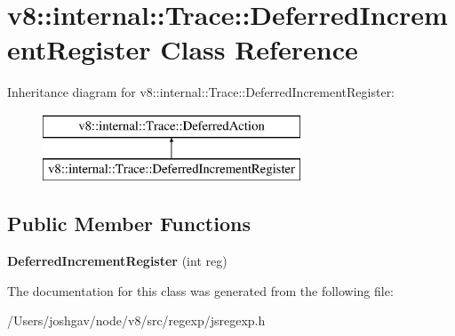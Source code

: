 \hypertarget{classv8_1_1internal_1_1_trace_1_1_deferred_increment_register}{}\section{v8\+:\+:internal\+:\+:Trace\+:\+:Deferred\+Increment\+Register Class Reference}
\label{classv8_1_1internal_1_1_trace_1_1_deferred_increment_register}
Inheritance diagram for v8\+:\+:internal\+:\+:Trace\+:\+:Deferred\+Increment\+Register\+:\begin{figure}[H]
\begin{center}
\leavevmode
\includegraphics[height=2.000000cm]{classv8_1_1internal_1_1_trace_1_1_deferred_increment_register}
\end{center}
\end{figure}
\subsection*{Public Member Functions}
\begin{DoxyCompactItemize}
\item 
{\bfseries Deferred\+Increment\+Register} (int reg)\hypertarget{classv8_1_1internal_1_1_trace_1_1_deferred_increment_register_a0e35fad1c635f9dc35105672d964b4e3}{}\label{classv8_1_1internal_1_1_trace_1_1_deferred_increment_register_a0e35fad1c635f9dc35105672d964b4e3}

\end{DoxyCompactItemize}


The documentation for this class was generated from the following file\+:\begin{DoxyCompactItemize}
\item 
/\+Users/joshgav/node/v8/src/regexp/jsregexp.\+h\end{DoxyCompactItemize}
